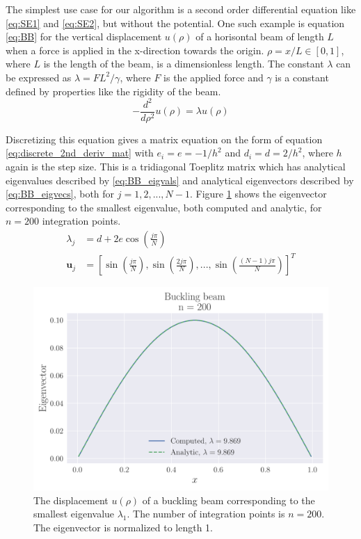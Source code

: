 \documentclass[reprint,english,notitlepage,nofootinbib]{revtex4-1}  %
\begin{document}
The simplest use case for our algorithm is a second order differential equation like \ref{eq:SE1} and \ref{eq:SE2}, but without the potential. One such example is equation \ref{eq:BB} for the vertical displacement $u(\rho)$ of a horisontal beam of length $L$ when a force is applied in the x-direction towards the origin. $\rho = x/L \in [0, 1]$, where $L$ is the length of the beam, is a dimensionless length. The constant $\lambda$ can be expressed as $\lambda = F L^2 / \gamma$, where $F$ is the applied force and $\gamma$ is a constant defined by properties like the rigidity of the beam.
\begin{equation}
	-\frac{d^2}{d\rho^2}u(\rho) = \lambda u(\rho)
	\label{eq:BB}
\end{equation}

Discretizing this equation gives a matrix equation on the form of equation \ref{eq:discrete_2nd_deriv_mat} with $e_i = e = -1/h^2$ and $d_i = d = 2/h^2$, where $h$ again is the step size. This is a tridiagonal Toeplitz matrix which has analytical eigenvalues described by \ref{eq:BB_eigvals} and analytical eigenvectors described by \ref{eq:BB_eigvecs}, both for $j = 1, 2, ..., N-1$. Figure \ref{fig:BB200} shows the eigenvector corresponding to the smallest eigenvalue, both computed and analytic, for $n = 200$ integration points.
\begin{align}
  \lambda_j &= d + 2 e \cos{\left( \frac{j \pi}{N} \right)} \label{eq:BB_eigvals} \\
  \mathbf u_j &= \left[ \sin{\left( \frac{j \pi}{N} \right)}, \sin{\left( \frac{2 j \pi}{N} \right)}, ..., \sin{\left( \frac{(N-1) j \pi}{N} \right)} \right]^T \label{eq:BB_eigvecs}
\end{align}

\begin{figure}[h]
	\centering
	\includegraphics[width=\linewidth]{../output/BB_200_0.pdf}
	\caption{The displacement $u(\rho)$ of a buckling beam corresponding to the smallest eigenvalue $\lambda_1$. The number of integration points is $n = 200$. The eigenvector is normalized to length 1.}
  \label{fig:BB200}
\end{figure}
\end{document}
